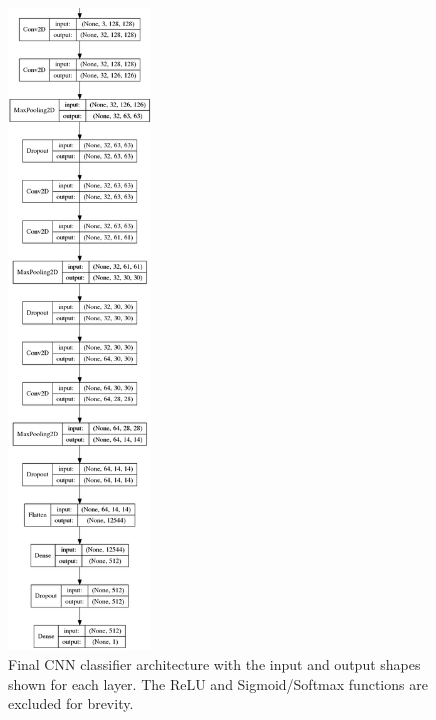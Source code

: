 \documentclass[10pt,twocolumn,letterpaper]{article}
\begin{document}
\begin{figure}[!htbp]
\begin{center}
\includegraphics[height=17cm]{model.png}
\end{center}
   \caption{Final CNN classifier architecture with the input and output shapes shown for each layer. The ReLU and Sigmoid/Softmax functions are excluded for brevity.}
\label{fig:architecture}
\end{figure}
\end{document}
